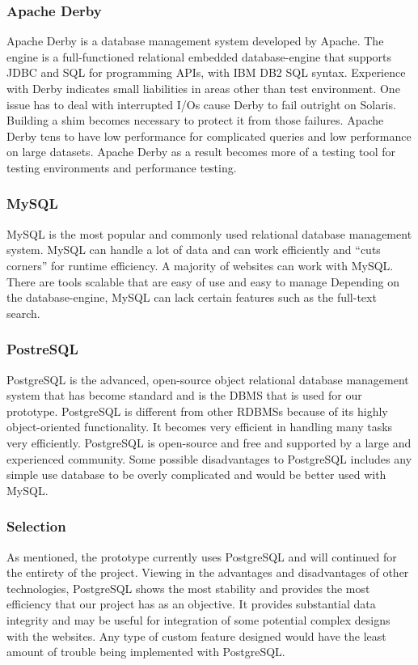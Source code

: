 \documentclass[draftclsnofoot,10pt,onecolumn]{IEEEtran} %
\begin{document}
\subsubsection{Apache Derby}
Apache Derby is a database management system developed by Apache. The engine is a full-functioned relational embedded
database-engine that supports JDBC and SQL for programming APIs, with IBM DB2 SQL syntax. Experience with Derby
indicates small liabilities in areas other than test environment. One issue has to deal with interrupted I/Os cause Derby to fail
outright on Solaris. Building a shim becomes necessary to protect it from those failures. Apache Derby tens to have low
performance for complicated queries and low performance on large datasets. Apache Derby as a result becomes more of a
testing tool for testing environments and performance testing. \\

\subsubsection{MySQL}
MySQL is the most popular and commonly used relational database management system. MySQL can handle a lot of data
and can work efficiently and “cuts corners” for runtime efficiency. A majority of websites can work with MySQL. There are
tools scalable that are easy of use and easy to manage Depending on the database-engine, MySQL can lack certain features
such as the full-text search. \\

\subsubsection{PostreSQL}
PostgreSQL is the advanced, open-source object relational database management system that has become standard and is the
DBMS that is used for our prototype. PostgreSQL is different from other RDBMSs because of its highly object-oriented
functionality. It becomes very efficient in handling many tasks very efficiently. PostgreSQL is open-source and free and
supported by a large and experienced community. Some possible disadvantages to PostgreSQL includes any simple use
database to be overly complicated and would be better used with MySQL. \\

\subsubsection{Selection}
As mentioned, the prototype currently uses PostgreSQL and will continued for the entirety of the project. Viewing in the
advantages and disadvantages of other technologies, PostgreSQL shows the most stability and provides the most efficiency
that our project has as an objective. It provides substantial data integrity and may be useful for integration of some potential
complex designs with the websites. Any type of custom feature designed would have the least amount of trouble being
implemented with PostgreSQL. \\
\end{document}
